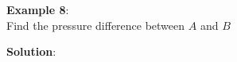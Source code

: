 \documentclass[10pt]{amsart}
\begin{document}
\vspace{3cm}
\begin{minipage}[t]{0.45\textwidth}	
	\raggedright
	\textbf{Example 8}:\\	
	Find the pressure difference between $A$ and $B$	
	\par\vspace{6cm}
\end{minipage}
\hfill 
\begin{minipage}[t]{0.5\textwidth}		
	\textbf{Solution}:
	\parb	
	\end{minipage}
	
\end{document}

